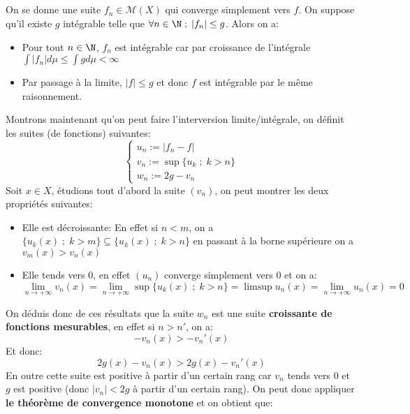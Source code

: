 \documentclass{report}
\begin{document}
   \subsection*{}

   
   \subsection*{}
   On se donne une suite \(f_n \in \mathscr{M}(X)\) qui converge simplement vers \(f\). On suppose qu'il existe \(g\) intégrable telle que \(\forall n \in \N \; ; \; |f_n| \leq g\). Alors on a:
   \begin{itemize}
      \item Pour tout \(n\in \N\), \(f_n\) est intégrable car par croissance de l'intégrale \(\int |f_n| d\mu \leq \int g d\mu < \infty\)
      \item Par passage à la limite, \(|f| \leq g\) et donc \(f\) est intégrable par le même raisonnement.
   \end{itemize}
   Montrons maintenant qu'on peut faire l'interversion limite/intégrale, on définit les suites (de fonctions) suivantes:
   \[
      \begin{cases}
         u_n := |f_n - f|\\
         v_n := \sup\{u_k \; ; \; k > n\}\\
         w_n := 2g - v_n
      \end{cases}
   \]
   Soit \(x \in X\), étudions tout d'abord la suite \((v_n)\), on peut montrer les deux propriétés suivantes:
   \begin{itemize}
   \item Elle est décroissante:
   En effet si \(n < m\), on a \(\{u_k(x) \; ; \; k > m\} \subseteq \{u_k(x) \; ; \; k > n\}\) en passant à la borne supérieure on a \(v_m(x) > v_n(x)\)
   \item Elle tends vers 0, en effet \((u_n)\) converge simplement vers 0 et on a:
   \[
      \lim_{n \rightarrow +\infty} v_n(x) =  \lim_{n \rightarrow +\infty} \sup\{u_k(x) \; ; \; k > n\} = \limsup u_n(x) = \lim_{n \rightarrow +\infty} u_n(x) = 0
   \]
   \end{itemize}
   On déduis donc de ces résultats que la suite \(w_n\) est une suite \textbf{croissante de fonctions mesurables}, en effet si \(n > n'\), on a:
   \[
      -v_n(x) > -v_n'(x) 
   \]
   Et donc:
   \[
      2g(x) - v_n(x) > 2g(x) -v_n'(x) 
   \]
   En outre cette suite est positive à partir d'un certain rang car \(v_n\) tends vers 0 et \(g\) est positive (donc \(|v_n| < 2g\) à partir d'un certain rang). On peut donc appliquer \textbf{le théorème de convergence monotone} et on obtient que:
\end{document}
